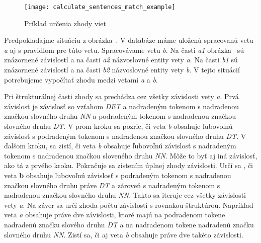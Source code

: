 \begin{figure}[H]
	\begin{center}\texttt{[image: calculate\_sentences\_match\_example]}\end{center}
	\caption[Príklad určenia zhody viet]{Príklad určenia zhody viet}\label{fig:calculate_match_sentences_example}
\end{figure}

Predpokladajme situáciu z obrázka~. V databáze máme uloženú spracovanú vetu \textit{a} aj s pravidlom pre túto vetu. Spracovávame vetu \textit{b}. Na časti \textit{a1} obrázka~ sú znázornené závislostí a na časti \textit{a2} názvoslovné entity vety \textit{a}. Na časti \textit{b1} sú znázornené závislostí a na časti \textit{b2} názvoslovné entity vety \textit{b}. V tejto situácií potrebujeme vypočítať zhodu medzi vetami \textit{a} a \textit{b}. 

Pri štrukturálnej časti zhody sa prechádza cez všetky závislosti vety \textit{a}. Prvá závislosť je závislosť so vzťahom \textit{DET} a nadradeným tokenom s nadradenou značkou slovného druhu \textit{NN} a podradeným tokenom s nadradenou značkou slovného druhu \textit{DT}. V prom kroku sa pozrie, či veta \textit{b} obsahuje ľubovoľnú závislosť s podradeným tokenom s nadradenou značkou slovného druhu \textit{DT}. V ďalšom kroku, sa zistí, či veta \textit{b} obsahuje ľubovoľnú závislosť s nadradeným tokenom s nadradenou značkou sloveného druhu \textit{NN}. Môže to byť aj iná závislosť, ako tá z prvého kroku. Pokračuje sa zistením úplnej zhody závislosti. Určí sa , či veta \textbf{b} obsahuje ľubovoľnú závislosť s podradeným tokenom s nadradenou značkou slovného druhu práve \textit{DT} a zároveň s nadradeným tokenom s nadradenou značkou slovného druhu \textit{NN}. Takto sa iteruje cez všetky závislosti vety \textit{a}. Na záver sa určí zhoda počtu závislostí s rovnakou štruktúrou. Napríklad veta \textit{a} obsahuje práve dve závislosti, ktoré majú na podradenom tokene nadradenú značku slového druhu \textit{DT} a na nadradenom tokene nadradenú značku slovného druhu \textit{NN}. Zistí sa, či aj veta \textit{b} obsahuje práve dve takéto závislosti. \\

